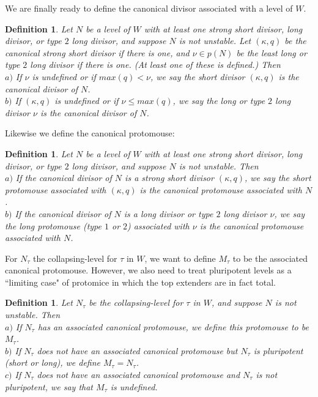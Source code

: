 \documentclass[12pt]{article}
\newtheorem{defn}[thm]{Definition}
\begin{document}
We are finally ready to define the canonical divisor associated with a level of $W$.\\

\begin{defn} \label{canonical divisor}
Let $N$ be a level of $W$ with at least one strong short divisor, long divisor, or type $2$ long divisor, and suppose $N$ is not unstable.  Let $(\kappa , q)$ be the canonical strong short divisor if there is one, and $\nu \in p(N)$ be the least long or type $2$ long divisor if there is one.  (At least one of these is defined.)  Then\\

$a)$ If $\nu$ is undefined or if $max(q) < \nu$, we say the short divisor $(\kappa , q)$ is the canonical divisor of $N$.\\

$b)$ If $(\kappa , q)$ is undefined or if $\nu \leq max (q)$, we say the long or type $2$ long divisor $\nu$ is the canonical divisor of $N$.
\end{defn}

Likewise we define the canonical protomouse:

\begin{defn} \label{canonical protomouse}
Let $N$ be a level of $W$ with at least one strong short divisor, long divisor, or type $2$ long divisor, and suppose $N$ is not unstable.  Then\\

$a)$ If the canonical divisor of $N$ is a strong short divisor $(\kappa , q)$, we say the short protomouse associated with $(\kappa , q)$ is the canonical protomouse associated with $N$.\\

$b)$ If the canonical divisor of $N$ is a long divisor or type $2$ long divisor $\nu$, we say the long protomouse (type $1$ or $2$) associated with $\nu$ is the canonical protomouse associated with $N$.\\
\end{defn}


For $N_\tau$ the collapsing-level for $\tau$ in $W$, we want to define $M_\tau$ to be the associated canonical protomouse.  However, we also need to treat pluripotent levels as a ``limiting case" of protomice in which the top extenders are in fact total.\\

\begin{defn} \label{associated M}
Let $N_\tau$ be the collapsing-level for $\tau$ in $W$, and suppose $N$ is not unstable.  Then\\

$a)$ If $N_\tau$ has an associated canonical protomouse, we define this protomouse to be $M_\tau$.\\

$b)$ If $N_\tau$ does not have an associated canonical protomouse but $N_\tau$ is pluripotent (short or long), we define $M_\tau = N_\tau$.\\

$c)$ If $N_\tau$ does not have an associated canonical protomouse and $N_\tau$ is not pluripotent, we say that $M_\tau$ is undefined.

\end{defn}
\end{document}
